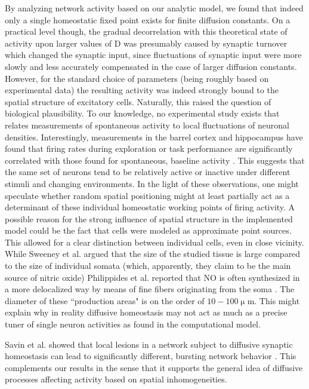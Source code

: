 \documentclass[10pt,letterpaper]{article}
\begin{document}
By analyzing network activity based on our analytic model, we found that indeed only a single homeostatic fixed point exists for finite diffusion constants. On a practical level though, the gradual decorrelation with this theoretical state of activity upon larger values of $\mathrm{D}$ was presumably caused by synaptic turnover which changed the synaptic input, since fluctuations of synaptic input were more slowly and less accurately compensated in the case of larger diffusion constants. However, for the standard choice of parameters (being roughly based on experimental data) the resulting activity was indeed strongly bound to the spatial structure of excitatory cells. Naturally, this raised the question of biological plausibility. To our knowledge, no experimental study exists that relates measurements of spontaneous activity to local fluctuations of neuronal densities. Interestingly, measurements in the barrel cortex and hippocampus have found that firing rates during exploration or task performance are significantly correlated with those found for spontaneous, baseline activity \cite{OConnor_2010,Mizuseki_2013}. This suggests that the same set of neurons tend to be relatively active or inactive under different stimuli and changing environments. In the light of these observations, one might speculate whether random spatial positioning might at least partially act as a determinant of these individual homeostatic working points of firing activity. A possible reason for the strong influence of spatial structure in the implemented model could be the fact that cells were modeled as approximate point sources. This allowed for a clear distinction between individual cells, even in close vicinity. While Sweeney et al. argued that the size of the studied tissue is large compared to the size of individual somata (which, apparently, they claim to be the main source of nitric oxide) Philippides et al. reported that NO is often synthesized in a more delocalized way by means of fine fibers originating from the soma \cite{Philippides_2005}. The diameter of these ``production areas" is on the order of $\mathrm{10-100 \upmu m}$. This might explain why in reality diffusive homeostasis may not act as much as a precise tuner of single neuron activities as found in the computational model.

Savin et al. showed that local lesions in a network subject to diffusive synaptic homeostasis can lead to significantly different, bursting network behavior \cite{Savin_2008}. This complements our results in the sense that it supports the general idea of diffusive processes affecting activity based on spatial inhomogeneities.
\end{document}
